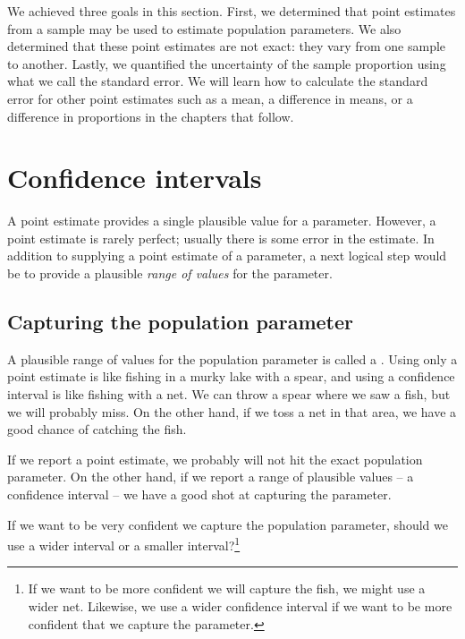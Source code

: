 We achieved three goals in this section. First, we determined that point estimates from a sample may be used to estimate population parameters. We also determined that these point estimates are not exact: they vary from one sample to another. Lastly, we quantified the uncertainty of the sample proportion using what we call the standard error. We will learn how to calculate the standard error for other point estimates such as a mean, a difference in means, or a difference in proportions in the chapters that follow. 

\section{Confidence intervals}
\label{ConfidenceIntervals}


A point estimate provides a single plausible value for a parameter. However, a point estimate is rarely perfect; usually there is some error in the estimate. In addition to supplying a point estimate of a parameter, a next logical step would be to provide a plausible \emph{range of values} for the parameter.


\subsection{Capturing the population parameter}

A plausible range of values for the population parameter is called a . Using only a point estimate is like fishing in a murky lake with a spear, and using a confidence interval is like fishing with a net. We can throw a spear where we saw a fish, but we will probably miss. On the other hand, if we toss a net in that area, we have a good chance of catching the fish.

If we report a point estimate, we probably will not hit the exact population parameter. On the other hand, if we report a range of plausible values -- a confidence interval -- we have a good shot at capturing the parameter.

\begin{exercise}
If we want to be very confident we capture the population parameter, should we use a wider interval or a smaller interval?\footnote{If we want to be more confident we will capture the fish, we might use a wider net. Likewise, we use a wider confidence interval if we want to be more confident that we capture the parameter.}
\end{exercise}


